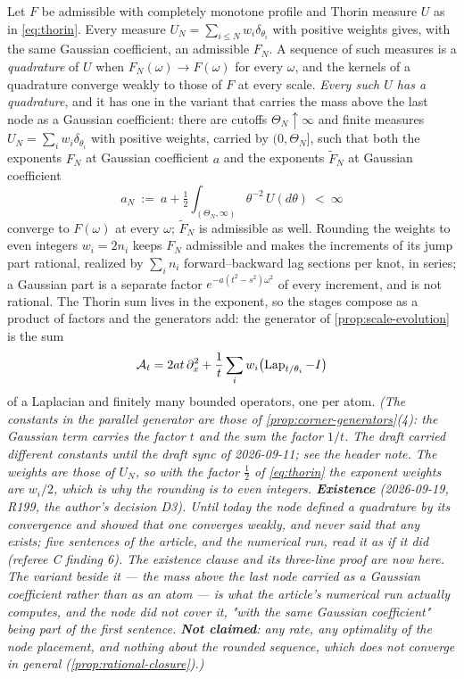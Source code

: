 \begin{proposition}\label{prop:thorin-machine}
Let $F$ be admissible with completely monotone profile and Thorin measure $U$ as in
\ref{eq:thorin}. Every measure $U_N = \sum_{i \le N} w_i\delta_{\theta_i}$ with positive weights gives,
with the same Gaussian coefficient, an admissible $F_N$. A sequence of such measures is a
\emph{quadrature} of $U$ when $F_N(\omega) \to F(\omega)$ for every $\omega$, and the kernels of
a quadrature converge weakly to those of $F$ at every scale. \emph{Every such $U$ has a
quadrature}, and it has one in the variant that carries the mass above the last node as a Gaussian
coefficient: there are cutoffs $\Theta_N \uparrow \infty$ and finite measures
$U_N = \sum_i w_i\delta_{\theta_i}$ with positive weights, carried by $(0,\Theta_N]$, such that
both the exponents $F_N$ at Gaussian coefficient $a$ and the exponents $\tilde F_N$ at Gaussian
coefficient
\[
  a_N \ :=\ a + \tfrac12\int_{(\Theta_N,\infty)}\theta^{-2}\,U(d\theta) \ <\ \infty
\]
converge to $F(\omega)$ at every $\omega$; $\tilde F_N$ is admissible as well. Rounding the weights to even
integers $w_i = 2n_i$ keeps $F_N$ admissible and makes the increments of its jump part rational,
realized by $\sum_i n_i$ forward--backward lag sections per knot, in series; a Gaussian part is
a separate factor $e^{-a(t^2-s^2)\omega^2}$ of every increment, and is not rational. The Thorin sum
lives in the exponent, so the stages compose as a product of factors and the generators add: the
generator of \ref{prop:scale-evolution} is the sum
\[
  \mathcal{A}_t = 2at\,\partial_x^2
   + \frac1t\sum_i w_i\bigl(\operatorname{Lap}_{t/\theta_i} - I\bigr)
\]
of a Laplacian and finitely many bounded operators, one per atom.
\statusT\quad\emph{(The constants in the parallel generator are those of
\ref{prop:corner-generators}(4): the Gaussian term carries the factor $t$ and the sum the factor
$1/t$. The draft carried different constants until the draft sync of 2026-09-11; see the header
note. The weights are those of $U_N$, so with the factor $\tfrac12$ of \ref{eq:thorin} the
exponent weights are $w_i/2$, which is why the rounding is to even integers.
\textbf{Existence} (2026-09-19, R199, the author's decision D3). Until today the node
\emph{defined} a quadrature by its convergence and showed that one converges weakly, and never
said that any exists; five sentences of the article, and the numerical run, read it as if it did
(referee C finding 6). The existence clause and its three-line proof are now here. The variant
beside it --- the mass above the last node carried as a Gaussian coefficient rather than as an
atom --- is what the article's numerical run actually computes, and the node did not cover it,
"with the same Gaussian coefficient" being part of the first sentence. \textbf{Not claimed}: any
rate, any optimality of the node placement, and nothing about the \emph{rounded} sequence, which
does not converge in general (\ref{prop:rational-closure}).)}
\end{proposition}

